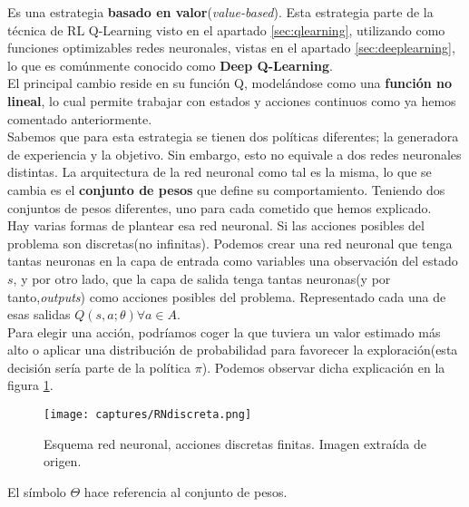 \documentclass[11pt,fleqn]{book} %
\begin{document}
Es una estrategia \textbf{basado en valor}(\textit{value-based}). Esta estrategia parte de la técnica de RL Q-Learning visto en el apartado \ref{sec:qlearning}, utilizando como funciones optimizables redes neuronales, vistas en el apartado \ref{sec:deeplearning}, lo que es comúnmente conocido como \textbf{Deep Q-Learning}.\\

El principal cambio reside en su función Q, modelándose como una \textbf{función no lineal}, lo cual permite trabajar con estados y acciones continuos como ya hemos comentado anteriormente. \\

Sabemos que para esta estrategia se tienen dos políticas diferentes; la generadora de experiencia y la objetivo. Sin embargo, esto no equivale a dos redes neuronales distintas. La arquitectura de la red neuronal como tal es la misma, lo que se cambia es el \textbf{conjunto de pesos} que define su comportamiento. Teniendo dos conjuntos de pesos diferentes, uno para cada cometido que hemos explicado. \\

Hay varias formas de plantear esa red neuronal. Si las acciones posibles del problema son discretas(no infinitas). Podemos crear una red neuronal que tenga tantas neuronas en la capa de entrada como variables una observación del estado $s$, y por otro lado, que la capa de salida tenga tantas neuronas(y por tanto,\textit{outputs}) como acciones posibles del problema. Representado cada una de esas salidas $Q(s,a;\theta) \forall a \in A$. \\

Para elegir una acción, podríamos coger la que tuviera un valor estimado más alto o aplicar una distribución de probabilidad para favorecer la exploración(esta decisión sería parte de la política $\pi$). Podemos observar dicha explicación en la figura \ref{fig:RNdiscreta}.

\begin{figure}[H]
	\centering\texttt{[image: captures/RNdiscreta.png]}
	\caption{Esquema red neuronal, acciones discretas finitas. Imagen extraída de origen. \cite{article:RLromero}}
	\label{fig:RNdiscreta} %
\end{figure}

El símbolo $\Theta$ hace referencia al conjunto de pesos. \\
\end{document}
